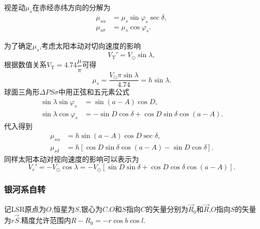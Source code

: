\documentclass[11pt, a4paper, oneside]{ctexart}
\numberwithin{equation}{subsection}
\begin{document}
视差动$\mu_{s}$在赤经赤纬方向的分解为
\begin{align}
\mu_{s\alpha}&=\mu_s\sin\varphi_s\sec\delta,\\
\mu_{s\sigma}&=\mu_s\cos\varphi_s.
\end{align}

为了确定$\mu_{s}$,考虑太阳本动对切向速度的影响
\begin{equation}
V_{\text{T}}'=V_{\odot}\sin\lambda,
\end{equation}
根据数值关系$V_{\text{T}}=4.74\dfrac{\mu}{\pi}$可得
\begin{equation}
\mu_{s}=\frac{V_{\odot}\pi\sin\lambda}{4.74}=h\sin\lambda.
\end{equation}
球面三角形$\Delta{}PS\sigma$中用正弦和五元素公式
\begin{align}
\sin\lambda\sin\varphi_s&=\sin\left(a-A\right)\cos D,\\
\sin\lambda\cos\varphi_s&=-\sin D\cos\delta+\cos D\sin\delta\cos\left(a-A\right).
\end{align}
代入得到
\begin{align}
\mu_{s\alpha}&=h\sin\left(a-A\right)\cos D\sec\delta,\\
\mu_{s\delta}&=h\left[\cos D\sin\delta\cos\left(a-A\right)-\sin D\cos\delta\right].
\end{align}
同样太阳本动对视向速度的影响可以表示为
\begin{equation}
V_r'=-V_\odot\cos\lambda=-V_\odot\left[\sin D\sin\delta+\cos D\cos\delta\cos\left(a-A\right)\right].
\end{equation}

\subsubsection{银河系自转}
记LSR原点为$O$,恒星为$S$,银心为$C$.$O$和$S$指向$C$的矢量分别为$\vec{R}_{0}$和$\vec{R}$,$O$指向$S$的矢量为$r\vec{S}$.精度允许范围内$R-R_{0}=-r\cos b\cos l$.
\end{document}
